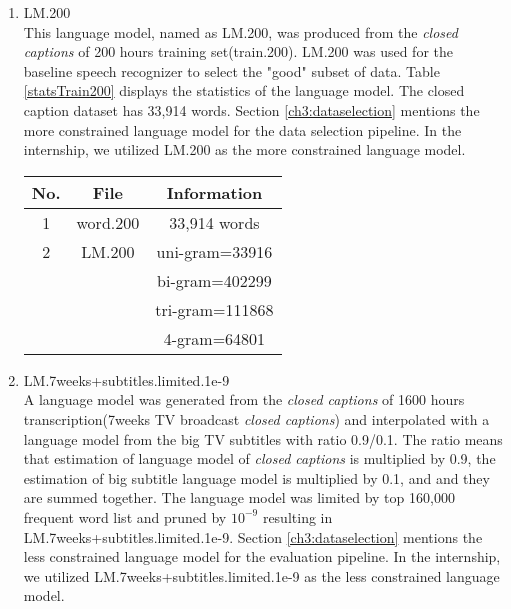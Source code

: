 \begin{enumerate}
\item LM.200 \\
This language model, named as LM.200, was produced from the \textit{closed captions} of 200 hours training set(train.200).   LM.200 was used for the baseline speech recognizer to select the "good" subset of data.  Table \ref{statsTrain200} displays the statistics of the language model. The closed caption dataset has 33,914 words. Section \ref{ch3:dataselection} mentions the more constrained language model for the data selection pipeline. In the internship, we utilized LM.200 as the more constrained language model.

\begin{center}
\label{statsTrain200}
\begin{tabular}{ | c | c | c | }
\hline
\textbf{No.} & \textbf{File}  & \textbf{Information} \\ \hline \hline
1 & word.200 & 33,914 words \\  \hline
2 & LM.200 & uni-gram=33916 \\ 
 & & bi-gram=402299 \\ 
& & tri-gram=111868 \\  
& & 4-gram=64801 \\  \hline
\end{tabular}
\end{center}

\item LM.7weeks+subtitles.limited.1e-9 \\
A language model was generated from the \textit{closed captions} of 1600 hours transcription(7weeks TV broadcast \textit{closed captions}) and interpolated with a language model from the big TV subtitles with ratio 0.9/0.1. The ratio means that estimation of language model of \textit{closed captions} is multiplied by 0.9, the estimation of big subtitle language model is multiplied by 0.1, and and they are summed together. The language model was limited by top 160,000 frequent word list and pruned by $10^{-9}$ resulting in LM.7weeks+subtitles.limited.1e-9.   Section \ref{ch3:dataselection} mentions the less constrained language model for the evaluation pipeline. In the internship, we utilized  LM.7weeks+subtitles.limited.1e-9  as the less constrained language model.




\end{enumerate}
